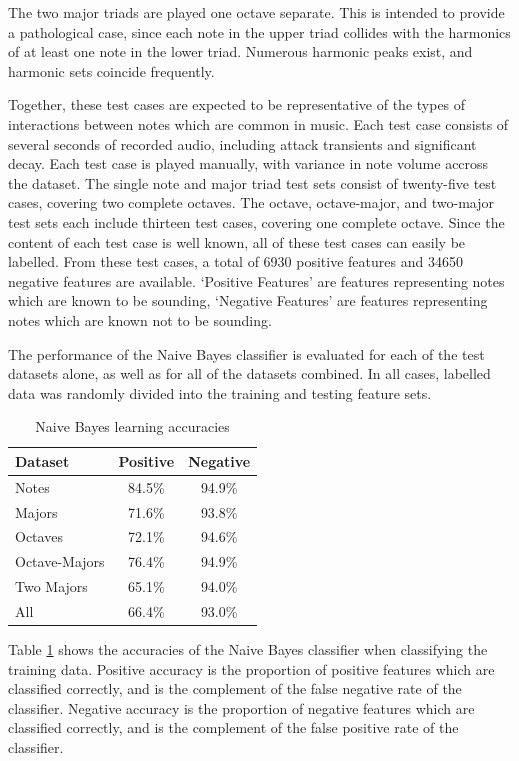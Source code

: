 \documentclass[twocolumn]{article}
\begin{document}
The two major triads are played one octave separate.  This is intended to provide a pathological case, since each note in the upper triad collides with the harmonics of at least one note in the lower triad.  Numerous harmonic peaks exist, and harmonic sets coincide frequently.

Together, these test cases are expected to be representative of the types of interactions between notes which are common in music.  Each test case consists of several seconds of recorded audio, including attack transients and significant decay.  Each test case is played manually, with variance in note volume accross the dataset.  The single note and major triad test sets consist of twenty-five test cases, covering two complete octaves.  The octave, octave-major, and two-major test sets each include thirteen test cases, covering one complete octave.  Since the content of each test case is well known, all of these test cases can easily be labelled.  From these test cases, a total of 6930 positive features and 34650 negative features are available.  `Positive Features' are features representing notes which are known to be sounding, `Negative Features' are features representing notes which are known not to be sounding.

The performance of the Naive Bayes classifier is evaluated for each of the test datasets alone, as well as for all of the datasets combined.  In all cases, labelled data was randomly divided into the training and testing feature sets.

\begin{table}[htb]
\centering
\begin{tabular}{|l|c|c|}
\hline
Dataset & Positive & Negative \\
\hline
Notes & 84.5\% & 94.9\% \\
\hline
Majors & 71.6\% & 93.8\% \\
\hline
Octaves & 72.1\% & 94.6\% \\
\hline
Octave-Majors & 76.4\% & 94.9\% \\
\hline
Two Majors & 65.1\% & 94.0\% \\
\hline
All & 66.4\% & 93.0\% \\
\hline
\end{tabular}
\caption{Naive Bayes learning accuracies}
\label{learning}
\end{table}

Table \ref{learning} shows the accuracies of the Naive Bayes classifier when classifying the training data.  Positive accuracy is the proportion of positive features which are classified correctly, and is the complement of the false negative rate of the classifier.  Negative accuracy is the proportion of negative features which are classified correctly, and is the complement of the false positive rate of the classifier.
\end{document}
